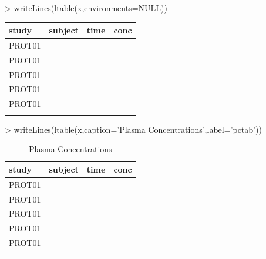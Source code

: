 \documentclass[titlepage]{article}
\begin{document}
\begin{Schunk}
\begin{Sinput}
> writeLines(ltable(x,environments=NULL))
\end{Sinput}
\begin{table}[!htpb]
 \begin{tabular}{lrrr}
   \hline \hline
  study & subject & time & conc \\ \hline
  PROT01 & \verb#1001# & \verb#0# & \verb#0.12# \\
  PROT01 & \verb#1001# & \verb#1# & \verb#34.00# \\
  PROT01 & \verb#1001# & \verb#2# & \verb#5.60# \\
  PROT01 & \verb#1002# & \verb#0# & \verb#0.50# \\
  PROT01 & \verb#1002# & \verb#1# & \verb#200.00# \\
   & \verb#1002# & \verb#2# & \verb## \\ \hline
 \end{tabular}
\end{table}\end{Schunk}
\begin{Schunk}
\begin{Sinput}
> writeLines(ltable(x,caption='Plasma Concentrations',label='pctab'))
\end{Sinput}
\begin{table}[!htpb]
 \caption[Plasma Concentrations]{Plasma Concentrations \label{pctab}}
 \begin{center}
  \begin{tabular}{lrrr}
    \hline \hline
   study & subject & time & conc \\ \hline
   PROT01 & \verb#1001# & \verb#0# & \verb#0.12# \\
   PROT01 & \verb#1001# & \verb#1# & \verb#34.00# \\
   PROT01 & \verb#1001# & \verb#2# & \verb#5.60# \\
   PROT01 & \verb#1002# & \verb#0# & \verb#0.50# \\
   PROT01 & \verb#1002# & \verb#1# & \verb#200.00# \\
    & \verb#1002# & \verb#2# & \verb## \\ \hline
  \end{tabular}
 \end{center}
\end{table}\end{Schunk}
\end{document}
